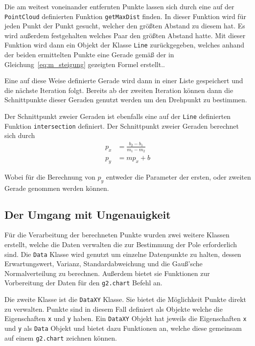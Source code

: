 Die am weitest voneinander entfernten Punkte lassen sich durch eine auf der \lstinline{PointCloud} definierten Funktion \lstinline{getMaxDist} finden. %
In dieser Funktion wird für jeden Punkt der Punkt gesucht, welcher den größten Abstand zu diesem hat. Es wird außerdem festgehalten welches Paar den größten Abstand hatte.
Mit dieser Funktion wird dann ein Objekt der Klasse \lstinline{Line} zurückgegeben, welches anhand der beiden ermittelten Punkte eine Gerade gemäß der in Gleichung~\ref{eq:m_steigung} gezeigten Formel erstellt..

Eine auf diese Weise definierte Gerade wird dann in einer Liste gespeichert und die nächste Iteration folgt.
Bereits ab der zweiten Iteration können dann die Schnittpunkte dieser Geraden genutzt werden um den Drehpunkt zu bestimmen.

Der Schnittpunkt zweier Geraden ist ebenfalls eine auf der \lstinline{Line} definierten Funktion \lstinline{intersection} definiert.
Der Schnittpunkt zweier Geraden berechnet sich durch
\begin{equation}
    \begin{split}
        p_x &= \frac{b_2 - b_1}{m_1 - m_2} \\
        p_y &= m p_x + b
    \end{split}
    \label{eq:schnittpunkt}
\end{equation}


Wobei für die Berechnung von $p_y$ entweder die Parameter der ersten, oder zweiten Gerade genommen werden können.

\subsection{Der Umgang mit Ungenauigkeit}

Für die Verarbeitung der berechneten Punkte wurden zwei weitere Klassen erstellt, welche die Daten verwalten die zur Bestimmung der Pole erforderlich sind.
Die \lstinline{Data} Klasse wird genutzt um einzelne Datenpunkte zu halten, dessen Erwartungswert, Varianz, Standardabweichung und die Gauß'sche Normalverteilung zu berechnen.
Außerdem bietet sie Funktionen zur Vorbereitung der Daten für den \lstinline{g2.chart} Befehl an.

Die zweite Klasse ist die \lstinline{DataXY} Klasse.
Sie bietet die Möglichkeit Punkte direkt zu verwalten.
Punkte sind in diesem Fall definiert als Objekte welche die Eigenschaften \lstinline{x} und \lstinline{y} haben.
Ein \lstinline{DataXY} Objekt hat jeweils die Eigenschaften \lstinline{x} und \lstinline{y} als \lstinline{Data} Objekt und bietet dazu Funktionen an, welche diese gemeinsam auf einem \lstinline{g2.chart} zeichnen können.

